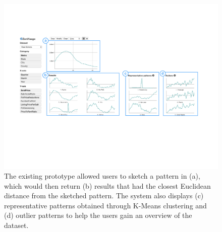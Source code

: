  \begin{figure}[h!]
 	\centering
 	\includegraphics[width=0.9\linewidth]{figures/oldZV_nozql.pdf}
 	\caption{The existing \zv prototype allowed users to sketch a pattern in (a), which would then return (b) results that had the closest Euclidean distance from the sketched pattern. The system also displays (c) representative patterns obtained through K-Means clustering and (d) outlier patterns to help the users gain an overview of the dataset.}
 	\label{oldZV}
 \end{figure}
